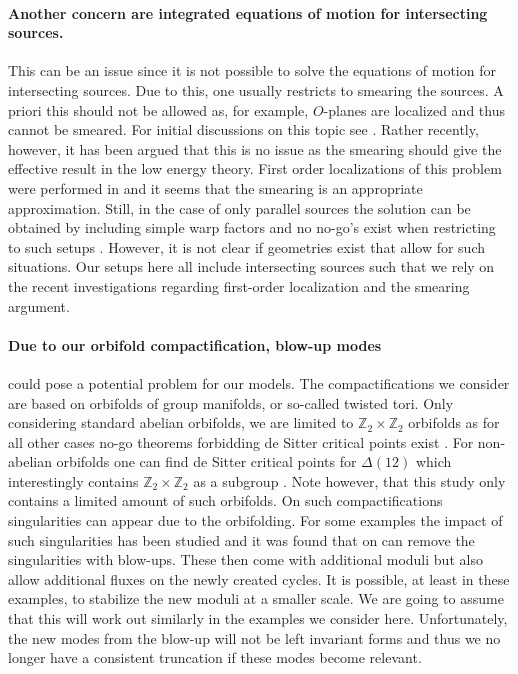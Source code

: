 \documentclass[12pt]{report}
\begin{document}
\paragraph{Another concern are integrated equations of motion for intersecting sources.} This can be an issue since it is not possible to solve the equations of motion for intersecting sources. Due to this, one usually restricts to smearing the sources. A priori this should not be allowed as, for example, $O$-planes are localized and thus cannot be smeared. For initial discussions on this topic see \cite{Douglas:2010rt,Blaback:2010sj,Blaback:2011nz,Blaback:2011pn,Saracco:2012wc,McOrist:2012yc}. Rather recently, however, it has been argued that this is no issue as the smearing should give the effective result in the low energy theory. First order localizations of this problem were performed in \cite{Junghans:2020acz,Marchesano:2020qvg,Cribiori:2021djm} and it seems that the smearing is an appropriate approximation. Still, in the case of only parallel sources the solution can be obtained by including simple warp factors and no no-go's exist when restricting to such setups \cite{Andriot:2016xvq}. However, it is not clear if geometries exist that allow for such situations. Our setups here all include intersecting sources such that we rely on the recent investigations regarding first-order localization and the smearing argument. 
\paragraph{Due to our orbifold compactification, blow-up modes} could pose a potential problem for our models. The compactifications we consider are based on orbifolds of group manifolds, or so-called twisted tori. Only considering standard abelian orbifolds, we are limited to $\mathbb{Z}_2 \times \mathbb{Z}_2$ orbifolds as for all other cases no-go theorems forbidding de Sitter critical points exist \cite{Flauger:2008ad}. For non-abelian orbifolds one can find de Sitter critical points for $\Delta(12)$ which interestingly contains $\mathbb{Z}_2 \times \mathbb{Z}_2$ as a subgroup \cite{Danielsson:2011au}. Note however, that this study only contains a limited amount of such orbifolds. On such compactifications singularities can appear due to the orbifolding. For some examples the impact of such singularities has been studied \cite{DeWolfe:2005uu,Ihl:2006pp} and it was found that on can remove the singularities with blow-ups. These then come with additional moduli but also allow additional fluxes on the newly created cycles. It is possible, at least in these examples, to stabilize the new moduli at a smaller scale. We are going to assume that this will work out similarly in the examples we consider here. Unfortunately, the new modes from the blow-up will not be left invariant forms and thus we no longer have a consistent truncation if these modes become relevant.
\end{document}
